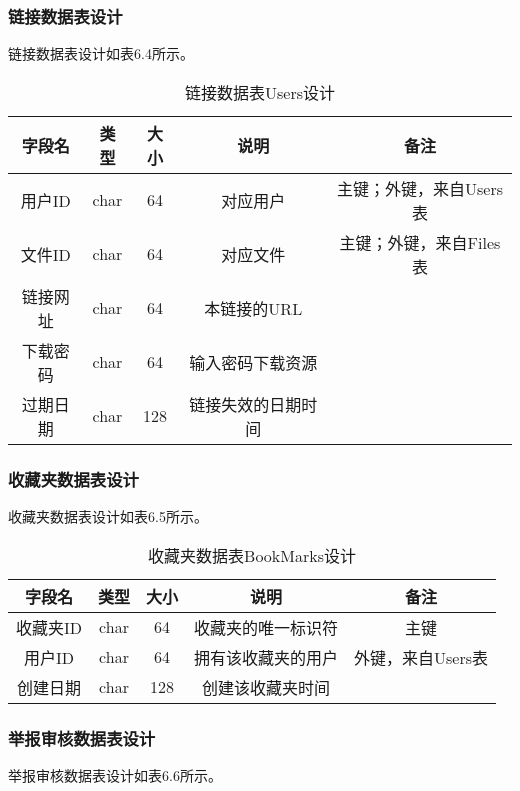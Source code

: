 \subsubsection{链接数据表设计}
链接数据表设计如表6.4所示。
\begin{table}[htbp]
\centering
\caption{链接数据表Users设计} \label{tab:link-database}
\begin{tabular}{|c|c|c|c|c|}
    \hline
    字段名 & 类型 & 大小 & 说明 & 备注 \\
    \hline
    用户ID & char & 64 & 对应用户 & 主键；外键，来自Users表\\
    \hline
    文件ID & char & 64 & 对应文件 & 主键；外键，来自Files表\\
    \hline
    链接网址 & char & 64 & 本链接的URL & \\
    \hline
    下载密码 & char & 64 & 输入密码下载资源 & \\
    \hline
    过期日期 & char & 128 & 链接失效的日期时间 & \\
    \hline 
\end{tabular}
\end{table}

\subsubsection{收藏夹数据表设计}
收藏夹数据表设计如表6.5所示。
\begin{table}[htbp]
\centering
\caption{收藏夹数据表BookMarks设计} \label{tab:bookmarks-database}
\begin{tabular}{|c|c|c|c|c|}
    \hline
    字段名 & 类型 & 大小 & 说明 & 备注 \\
    \hline
    收藏夹ID & char & 64 & 收藏夹的唯一标识符 & 主键\\
    \hline
    用户ID & char & 64 & 拥有该收藏夹的用户 & 外键，来自Users表\\
    \hline
    创建日期 & char & 128 & 创建该收藏夹时间 & \\
    \hline
\end{tabular}
\end{table}

\subsubsection{举报审核数据表设计}
举报审核数据表设计如表6.6所示。  
 
